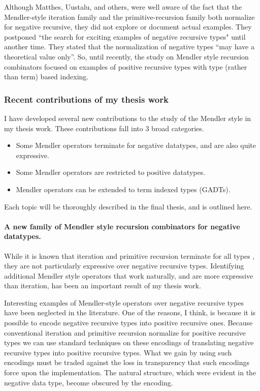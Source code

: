 Although Matthes, Uustalu, and others, were well aware of the fact that
the Mendler-style iteration family and the primitive-recursion family both
normalize for negative recursive, they did not explore or document actual
examples. They postponed ``the search for exciting examples of negative
recursive types" until another time. They stated that the normalization
of negative types ``may have a theoretical value
only''\cite{UusVen99}. So, until recently, the study on Mendler style recursion
combinators focused on examples of positive recursive types with type (rather than term) based indexing.

\subsubsection{Recent contributions of my thesis work}
I have developed several new contributions to the study of the Mendler style
in my thesis work. These contributions fall into 3 broad categories.
\begin{itemize}
\item Some Mendler operators terminate for negative datatypes, and are also quite expressive.
\item Some Mendler operators are restricted to positive datatypes.
\item Mendler operators can be extended to term indexed types (GADTs).
\end{itemize}
Each topic will be thoroughly described in the final thesis, and is outlined here.


\paragraph{A new family of Mendler style recursion combinators for negative datatypes.}

While it is known that iteration and primitive recursion terminate for all types
\cite{AbeMatUus05,AbeMat04}, they are not particularly expressive over negative
recursive types. Identifying additional Mendler style operators that work
naturally, and are more expressive than iteration, has been an important result
of my thesis work.

Interesting examples of Mendler-style operators over negative recursive types
have been neglected in the literature. One of the reasons, I think, is because
it is possible to encode negative recursive types into positive recursive ones. Because conventional iteration and primitive recursion normalize for
positive recursive types we can use standard techniques on these encodings
of translating negative recursive types into positive recursive types.
What we gain by using such encodings must be traded against the loss in
transparency that such encodings force upon the implementation. The natural
structure, which were evident in the negative data type, become obscured by
the encoding.

